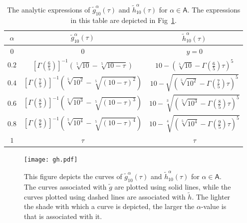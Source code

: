 \documentclass[twoside,reqno,11pt]{fcaa-var} %
\begin{document}
\begin{table}[h!]
 \centering
 \caption{The analytic expressions of $\widetilde{g}_{10}^{\alpha}(\tau)$ and $\widetilde{h}_{10}^{\alpha}(\tau)$ for $\alpha\in\mathsf{A}$. The expressions in this table are depicted in Fig~\ref{fig:gandh}.}
 \label{tab:gandh}
 \begin{tabular}{|c || c | c|} 
 \hline 
 \rule{0pt}{3ex}
 $\alpha$ &  $\widetilde{g}_{10}^{\alpha}(\tau)$ & $\widetilde{h}_{10}^{\alpha}(\tau)$ \\
 \hline\hline
 $0$ & 0 & $y=0$ \\ 
 $0.2$ & $[\Gamma\left (\frac{6}{5} \right )]^{-1}\left(\sqrt[5]{10}-\sqrt[5]{10-\tau}\right)$ & $10 - \left ( \sqrt[5]{10} -  \Gamma\left (\frac{6}{5} \right ) \tau \right )^5$  \\
 $0.4$ & $[\Gamma\left (\frac{7}{5} \right )]^{-1}\left(\sqrt[5]{10^2}-\sqrt[5]{(10-\tau)^2}\right)$ & $10 - \sqrt{\left ( \sqrt[5]{10^2} -  \Gamma\left (\frac{7}{5} \right ) \tau \right )^5}$ \\
 $0.6$ & $[\Gamma\left (\frac{8}{5} \right )]^{-1}\left(\sqrt[5]{10^3}-\sqrt[5]{(10-\tau)^3}\right)$ & $10 - \sqrt[3]{\left ( \sqrt[5]{10^3} -  \Gamma\left (\frac{8}{5} \right ) \tau \right )^5}$ \\
 $0.8$ & $[\Gamma\left (\frac{9}{5} \right )]^{-1}\left(\sqrt[5]{10^4}-\sqrt[5]{(10-\tau)^4}\right)$ & $10 - \sqrt[4]{\left ( \sqrt[5]{10^4} -  \Gamma\left (\frac{9}{5} \right ) \tau \right )^5}$ \\ [1ex] 
 $1$ & $\tau$ & $\tau$ \\ [1ex] 
 \hline
 \end{tabular}
 \end{table}

\begin{figure}[htb]
\centering
\texttt{[image: gh.pdf]}
\caption{This figure depicts the curves of $\widetilde{g}_{10}^{\alpha}(\tau)$ and $\widetilde{h}_{10}^{\alpha}(\tau)$ for $\alpha\in\mathsf{A}$. The curves associated with $\widetilde{g}$ are plotted using solid lines, while the curves plotted using dashed lines are associated with $\widetilde{h}$. The lighter the shade with which a curve is depicted, the larger the $\alpha$-value is that is associated with it.}
\label{fig:gandh}
\end{figure}
\end{document}
